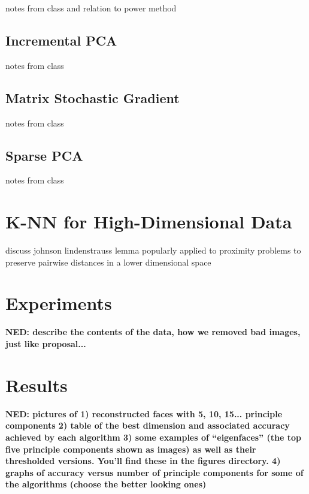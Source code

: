 \documentclass[11pt,letterpaper]{article}
\begin{document}
notes from class and relation to power method


\subsection{Incremental PCA}
notes from class


\subsection{Matrix Stochastic Gradient}

notes from class

\subsection{Sparse PCA}

notes from class


\section{K-NN for High-Dimensional Data}

discuss johnson lindenstrauss lemma popularly applied to proximity problems to preserve pairwise distances in a lower dimensional space

\section{Experiments}

{\bf NED: describe the contents of the data, how we removed bad images, just like proposal...} 

\section{Results}

{\bf NED: pictures of 1) reconstructed faces with 5, 10, 15... principle components 
2) table of the best dimension and associated accuracy achieved by each algorithm 
3) some examples of ``eigenfaces'' (the top five principle components shown as images) as well as their thresholded versions. You'll find these in the figures directory. 
4) graphs of accuracy versus number of principle components for some of the algorithms (choose the better looking ones)}
\end{document}
